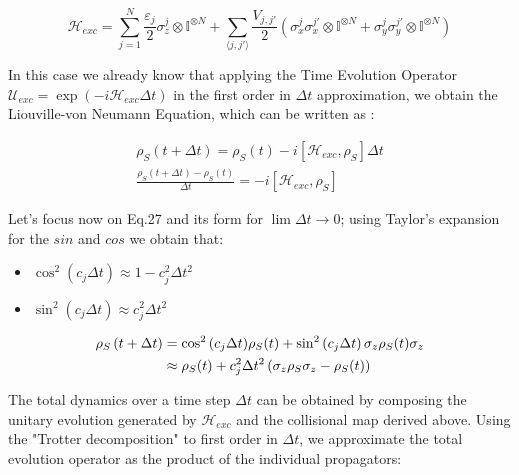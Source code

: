 \documentclass[a4paper,12pt]{article}
\begin{document}
	\begin{equation}
		\mathcal{H}_{exc} = \sum_{j=1}^{N} {\frac{\varepsilon_j}{2} \sigma_{z}^{j} \otimes \mathbb{I}^{\otimes N} } + \sum_{\langle j,j' \rangle} {\frac{V_{j,j'}}{2} \left( \sigma_{x}^{j}\sigma_{x}^{j'} \otimes \mathbb{I}^{\otimes N} + \sigma_{y}^{j}\sigma_{y}^{j'} \otimes \mathbb{I}^{\otimes N} \right)}
	\end{equation}
	
	In this case we already know that applying the Time Evolution Operator $ \mathcal{U}_{exc} = \exp {\left( -i \mathcal{H}_{exc}\Delta t \right)} $ in the first order in $ \Delta t $ approximation, we obtain the Liouville-von Neumann Equation, which can be written as : 
	
	\begin{align}
		\rho_S \left(t + \Delta t\right) = \rho_S (t) - i \left[\mathcal{H}_{exc}, \rho_S \right] \Delta t \\
		\frac{\rho_S \left(t + \Delta t\right) - \rho_S (t)}{\Delta t} = - i \left[\mathcal{H}_{exc}, \rho_S \right]
	\end{align} 
	
	Let's focus now on Eq.27 and its form for $ \lim \Delta t \rightarrow 0  $; using Taylor's expansion for the $ sin $ and $ cos $ we obtain that:
	
	\begin{itemize}
		\item $ \cos^{2}{\left(c_{j} \Delta t \right)} \approx 1 - c_{j}^{2} \Delta t ^{2} $
		\item $ \sin^{2}{\left(c_{j} \Delta t \right)} \approx c_{j}^{2} \Delta t ^{2} $
	\end{itemize} 
	
	\begin{align}
		\rho_S \left(t + \Delta t\right) & = \cos^{2}{\left(c_{j} \Delta t\right)} \rho_S (t) + \sin^{2}{\left(c_{j} \Delta t\right)} \, \sigma_{z} \rho_S (t) \sigma_{z} \notag \\ 
		& \approx \rho_S (t) + c_{j}^{2} \Delta t ^{2} \left( \sigma_{z} \rho_S \sigma_{z} - \rho_S (t) \right)
	\end{align}
	
	\clearpage
	\newpage
	
	The total dynamics over a time step $\Delta t$ can be obtained by composing the unitary evolution generated by $\mathcal{H}_{exc}$ and the collisional map derived above. Using the "Trotter decomposition" to first order in $\Delta t$, we approximate the total evolution operator as the product of the individual propagators:
	
\end{document}
